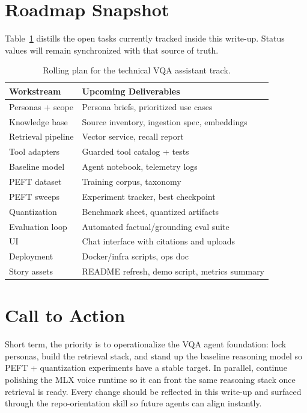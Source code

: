 \documentclass[11pt]{article}
\begin{document}
\section{Roadmap Snapshot}
Table~\ref{tab:roadmap} distills the open tasks currently tracked inside
this write-up. Status values will remain synchronized with that source
of truth.

\begin{table}[h]
    \centering
    \begin{tabular}{@{}ll@{}}
        \toprule
        \textbf{Workstream} & \textbf{Upcoming Deliverables} \\
        \midrule
        Personas + scope & Persona briefs, prioritized use cases \\
        Knowledge base & Source inventory, ingestion spec, embeddings \\
        Retrieval pipeline & Vector service, recall report \\
        Tool adapters & Guarded tool catalog + tests \\
        Baseline model & Agent notebook, telemetry logs \\
        PEFT dataset & Training corpus, taxonomy \\
        PEFT sweeps & Experiment tracker, best checkpoint \\
        Quantization & Benchmark sheet, quantized artifacts \\
        Evaluation loop & Automated factual/grounding eval suite \\
        UI & Chat interface with citations and uploads \\
        Deployment & Docker/infra scripts, ops doc \\
        Story assets & README refresh, demo script, metrics summary \\
        \bottomrule
    \end{tabular}
    \caption{Rolling plan for the technical VQA assistant track.}
    \label{tab:roadmap}
\end{table}

\section{Call to Action}
Short term, the priority is to operationalize the VQA agent foundation:
lock personas, build the retrieval stack, and stand up the baseline
reasoning model so PEFT + quantization experiments have a stable target.
In parallel, continue polishing the MLX voice runtime so it can front
the same reasoning stack once retrieval is ready. Every change should be
reflected in this write-up and surfaced through the repo-orientation
skill so future agents can align instantly.
\end{document}
